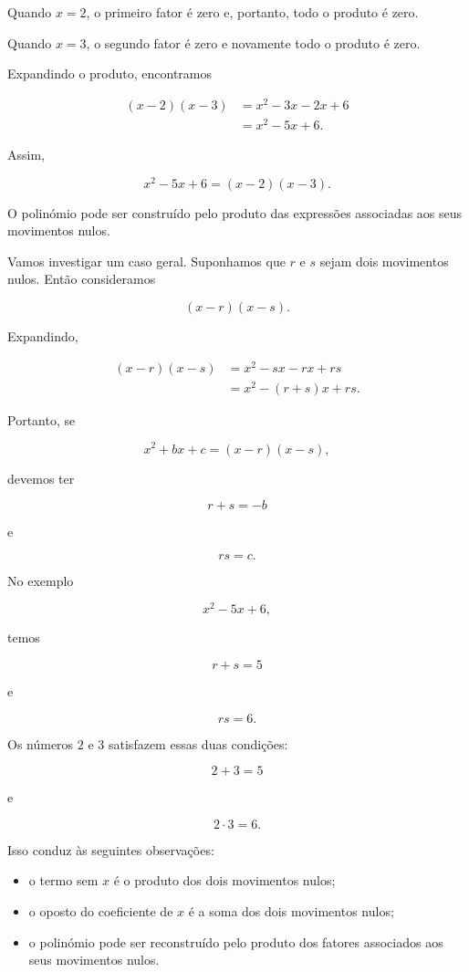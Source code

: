 \documentclass[12pt,a4paper]{article}
\begin{document}
Quando \(x=2\), o primeiro fator é zero e, portanto, todo o produto é
zero.

Quando \(x=3\), o segundo fator é zero e novamente todo o produto é
zero.

Expandindo o produto, encontramos

\[
\begin{aligned}
(x-2)(x-3)
&=x^2-3x-2x+6\\
&=x^2-5x+6.
\end{aligned}
\]

Assim,

\[
x^2-5x+6=(x-2)(x-3).
\]

O polinómio pode ser construído pelo produto das expressões associadas
aos seus movimentos nulos.

Vamos investigar um caso geral. Suponhamos que \(r\) e \(s\) sejam dois
movimentos nulos. Então consideramos

\[
(x-r)(x-s).
\]

Expandindo,

\[
\begin{aligned}
(x-r)(x-s)
&=x^2-sx-rx+rs\\
&=x^2-(r+s)x+rs.
\end{aligned}
\]

Portanto, se

\[
x^2+bx+c=(x-r)(x-s),
\]

devemos ter

\[
r+s=-b
\]

e

\[
rs=c.
\]

No exemplo

\[
x^2-5x+6,
\]

temos

\[
r+s=5
\]

e

\[
rs=6.
\]

Os números \(2\) e \(3\) satisfazem essas duas condições:

\[
2+3=5
\]

e

\[
2\cdot3=6.
\]

Isso conduz às seguintes observações:

\begin{itemize}
    \item o termo sem \(x\) é o produto dos dois movimentos nulos;
    \item o oposto do coeficiente de \(x\) é a soma dos dois movimentos
    nulos;
    \item o polinómio pode ser reconstruído pelo produto dos fatores
    associados aos seus movimentos nulos.
\end{itemize}
\end{document}
